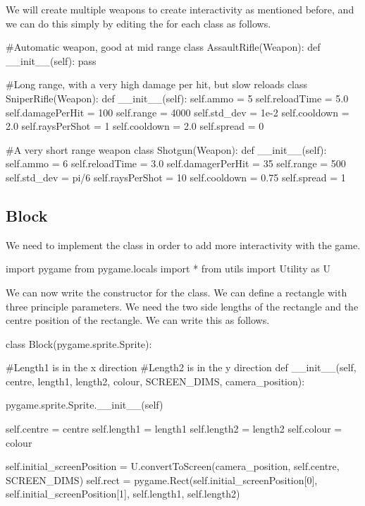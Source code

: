\vs
We will create multiple weapons to create interactivity as mentioned before, and we can do this simply by editing the  for each class as follows.

\begin{mpy}
#Automatic weapon, good at mid range
class AssaultRifle(Weapon):
    def __init__(self):
        pass

#Long range, with a very high damage per hit, but slow reloads
class SniperRifle(Weapon):
    def __init__(self):
        self.ammo = 5
        self.reloadTime = 5.0
        self.damagePerHit = 100
        self.range = 4000
        self.std_dev = 1e-2
        self.cooldown = 2.0
        self.raysPerShot = 1
        self.cooldown = 2.0
        self.spread = 0

#A very short range weapon
class Shotgun(Weapon):
    def __init__(self):
        self.ammo = 6
        self.reloadTime = 3.0
        self.damagerPerHit = 35
        self.range = 500
        self.std_dev = pi/6
        self.raysPerShot = 10
        self.cooldown = 0.75
        self.spread = 1
\end{mpy}

\subsection{Block}

We need to implement the  class in order to add more interactivity with the game.

\begin{mpy}
import pygame
from pygame.locals import *
from utils import Utility as U
\end{mpy}

We can now write the constructor for the class. We can define a rectangle with three principle parameters. We need the two side lengths of the rectangle and the centre position of the rectangle. We can write this as follows.

\begin{mpy}
class Block(pygame.sprite.Sprite):

#Length1 is in the x direction
#Length2 is in the y direction
def __init__(self, centre, length1, length2, colour, SCREEN_DIMS, camera_position):

    pygame.sprite.Sprite.__init__(self)

    self.centre = centre
    self.length1 = length1
    self.length2 = length2
    self.colour = colour

    self.initial_screenPosition = U.convertToScreen(camera_position, self.centre, SCREEN_DIMS)
    self.rect = pygame.Rect(self.initial_screenPosition[0], self.initial_screenPosition[1], self.length1, self.length2)
\end{mpy}

